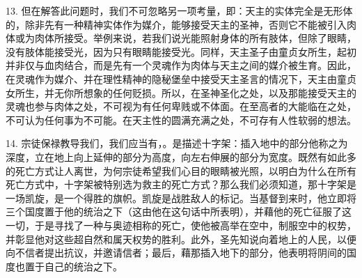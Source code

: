13. 但在解答此问题时，我们不可忽略另一项考量，即：天主的实体完全是无形体的，除非先有一种精神实体作为媒介，能够接受天主的圣神，否则它不能被引入肉体或为肉体所接受。举例来说，若我们说光能照射身体的所有肢体，但除了眼睛，没有肢体能接受光，因为只有眼睛能接受光。同样，天主圣子由童贞女所生，起初并非仅与血肉结合，而是先有一个灵魂作为肉体与天主之间的媒介被生育。因此，在灵魂作为媒介、并在理性精神的隐秘堡垒中接受天主圣言的情况下，天主由童贞女所生，并无你所想象的任何贬损。所以，在圣神圣化之处，以及那能接受天主的灵魂也参与肉体之处，不可视为有任何卑贱或不体面。在至高者的大能临在之处，不可认为任何事为不可能。在天主性的圆满充满之处，不可存有人性软弱的想法。\par

14. 宗徒保禄教导我们，我们应当有，。是描述十字架：插入地中的部分他称之为深度，立在地上向上延伸的部分为高度，向左右伸展的部分为宽度。既然有如此多的死亡方式让人离世，为何宗徒希望我们心目的眼睛被光照，以明白为什么在所有死亡方式中，十字架被特别选为救主的死亡方式？那么我们必须知道，那十字架是一场凯旋，是一个得胜的旗帜。凯旋是战胜敌人的标记。当基督到来时，他立即将三个国度置于他的统治之下（这由他在这句话中所表明），并藉他的死亡征服了这一切，于是寻找了一种与奥迹相称的死亡，使他被高举在空中，制服空中的权势，并彰显他对这些超自然和属天权势的胜利。此外，圣先知说向着地上的人民，以便向不信者提出抗议，并邀请信者；最后，藉那插入地下的部分，他表明将阴间的国度也置于自己的统治之下。\par

